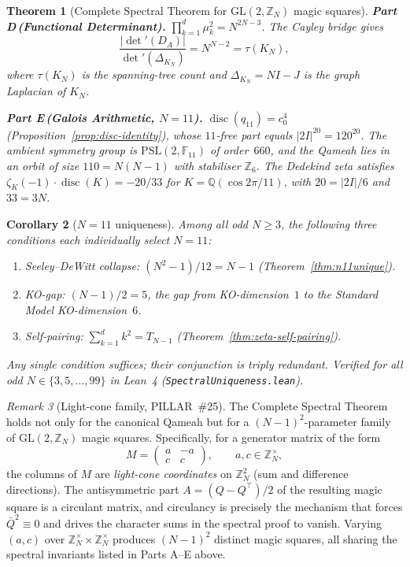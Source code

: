 \documentclass[aps,prd,twocolumn,superscriptaddress,floatfix,nofootinbib]{revtex4-2}
\newtheorem{theorem}{Theorem}
\newtheorem{corollary}[theorem]{Corollary}
\theoremstyle{definition}
\theoremstyle{remark}
\newtheorem{remark}[theorem]{Remark}
\begin{document}
\begin{theorem}[Complete Spectral Theorem for $\mathrm{GL}(2,\mathbb{Z}_N)$ magic squares]
\smallskip
\noindent\textbf{Part D\,(Functional Determinant).}\enspace
$\prod_{k=1}^{d}\mu_k^2 = N^{2N-3}$.
The Cayley bridge gives
\[
  \frac{|\det'(D_A)|}{\det'(\Delta_{K_N})}
  = N^{N-2} = \tau(K_N),
\]
where $\tau(K_N)$ is the spanning-tree count
and $\Delta_{K_N} = NI - J$ is the graph Laplacian of $K_N$.

\smallskip
\noindent\textbf{Part E\,(Galois Arithmetic, $N{=}11$).}\enspace
$\operatorname{disc}(q_{11}) = c_0^4$
(Proposition~\textup{\ref{prop:disc-identity}}),
whose $11$-free part equals $|2I|^{20} = 120^{20}$.
The ambient symmetry group is $\mathrm{PSL}(2,\mathbb{F}_{11})$
of order~$660$, and the Qameah lies in an orbit of size
$110 = N(N{-}1)$ with stabiliser $\mathbb{Z}_6$.
The Dedekind zeta satisfies
$\zeta_K(-1)\cdot\operatorname{disc}(K) = -20/33$
for $K = \mathbb{Q}(\cos 2\pi/11)$, with $20 = |2I|/6$ and $33 = 3N$.
\end{theorem}

\begin{corollary}[$N{=}11$ uniqueness]
\label{cor:n11-unique}
Among all odd $N \geq 3$, the following three conditions
each \emph{individually} select $N=11$:
\begin{enumerate}
\item[\textup{(F1)}]
  Seeley--DeWitt collapse:
  $(N^2{-}1)/12 = N{-}1$
  (Theorem~\textup{\ref{thm:n11unique}}).
\item[\textup{(F2)}]
  KO-gap: $(N{-}1)/2 = 5$, the gap from KO-dimension~$1$ to the
  Standard Model KO-dimension~$6$.
\item[\textup{(F3)}]
  Self-pairing:
  $\sum_{k=1}^{d}k^2 = T_{N-1}$
  (Theorem~\textup{\ref{thm:zeta-self-pairing}}).
\end{enumerate}
Any single condition suffices; their conjunction is triply redundant.
Verified for all odd $N \in \{3,5,\ldots,99\}$ in Lean~4
(\texttt{SpectralUniqueness.lean}).
\end{corollary}

\begin{remark}[Light-cone family, PILLAR~\#25]
\label{rem:lightcone-family}
The Complete Spectral Theorem holds not only for the canonical Qameah
but for a $(N-1)^2$-parameter family of $\mathrm{GL}(2,\mathbb{Z}_N)$
magic squares.  Specifically, for a generator matrix of the form
\[
  M = \begin{pmatrix} a & -a \\ c & c \end{pmatrix},
  \qquad a,c \in \mathbb{Z}_N^{\times},
\]
the columns of $M$ are \emph{light-cone coordinates} on
$\mathbb{Z}_N^2$ (sum and difference directions).
The antisymmetric part $A = (Q - Q^{\!\top})/2$ of the resulting
magic square is a circulant matrix, and circulancy is precisely the
mechanism that forces $\bar{Q}^2 \equiv 0$ and drives the character
sums in the spectral proof to vanish.
Varying $(a,c)$ over $\mathbb{Z}_N^{\times} \times \mathbb{Z}_N^{\times}$
produces $(N-1)^2$ distinct magic squares, all sharing the spectral
invariants listed in Parts A--E above.
\end{remark}
\end{document}
